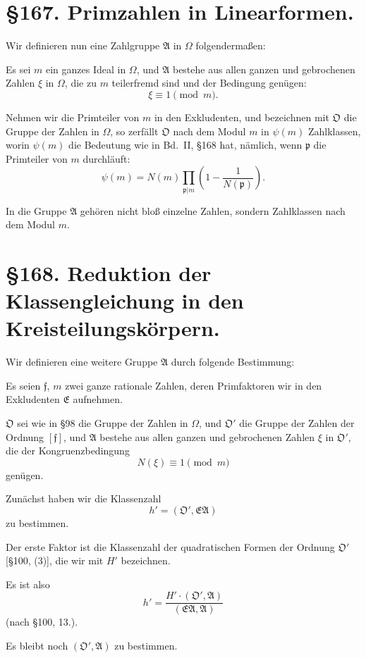 \documentclass[12pt,a4paper]{article}
\begin{document}
\section*{\S 167. Primzahlen in Linearformen.}

Wir definieren nun eine Zahlgruppe $\mathfrak{A}$ in $\Omega$ folgenderma\ss{}en:

Es sei $m$ ein ganzes Ideal in $\Omega$, und $\mathfrak{A}$ bestehe aus allen ganzen und gebrochenen Zahlen $\xi$ in $\Omega$, die zu $m$ teilerfremd sind und der Bedingung gen\"ugen:
\begin{equation}\xi \equiv 1 \pmod{m}.\end{equation}

Nehmen wir die Primteiler von $m$ in den Exkludenten, und bezeichnen mit $\mathfrak{O}$ die Gruppe der Zahlen in $\Omega$, so zerf\"allt $\mathfrak{O}$ nach dem Modul $m$ in $\psi(m)$ Zahlklassen, worin $\psi(m)$ die Bedeutung wie in Bd.~II, \S 168 hat, n\"amlich, wenn $\mathfrak{p}$ die Primteiler von $m$ durchl\"auft:
\begin{equation}\psi(m) = N(m) \prod_{\mathfrak{p}|m} \left(1 - \frac{1}{N(\mathfrak{p})}\right).\end{equation}

In die Gruppe $\mathfrak{A}$ geh\"oren nicht blo\ss{} einzelne Zahlen, sondern Zahlklassen nach dem Modul $m$.

\section*{\S 168. Reduktion der Klassengleichung in den Kreisteilungsk\"orpern.}

Wir definieren eine weitere Gruppe $\mathfrak{A}$ durch folgende Bestimmung:

Es seien $\mathfrak{f}$, $m$ zwei ganze rationale Zahlen, deren Primfaktoren wir in den Exkludenten $\mathfrak{E}$ aufnehmen.

$\mathfrak{O}$ sei wie in \S 98 die Gruppe der Zahlen in $\Omega$, und $\mathfrak{O}'$ die Gruppe der Zahlen der Ordnung $[\mathfrak{f}]$, und $\mathfrak{A}$ bestehe aus allen ganzen und gebrochenen Zahlen $\xi$ in $\mathfrak{O}'$, die der Kongruenzbedingung
\begin{equation}N(\xi) \equiv 1 \pmod{m}\end{equation}
gen\"ugen.

Zun\"achst haben wir die Klassenzahl
\begin{equation}h' = (\mathfrak{O}', \mathfrak{E}\mathfrak{A})\end{equation}
zu bestimmen.

Der erste Faktor ist die Klassenzahl der quadratischen Formen der Ordnung $\mathfrak{O}'$ [\S 100, (3)], die wir mit $H'$ bezeichnen.

Es ist also
\begin{equation}h' = \frac{H' \cdot (\mathfrak{O}', \mathfrak{A})}{(\mathfrak{E}\mathfrak{A}, \mathfrak{A})}\end{equation}
(nach \S 100, 13.).

Es bleibt noch $(\mathfrak{O}', \mathfrak{A})$ zu bestimmen.
\end{document}
